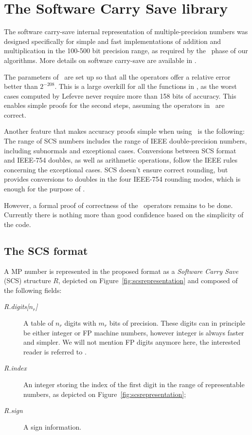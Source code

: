 \section{The Software Carry Save library
\label{sec:SCSLib}}

The software carry-save internal representation of multiple-precision
numbers was designed specifically for simple and fast implementations
of addition and multiplication in the 100-500 bit precision range, as
required by the \accurate\ phase of our algorithms. More details on
software carry-save are available in \cite{DefDin2002,DinDef2003}.

The parameters of \scslib\ are set up so that all the operators offer
a relative error better than $2^{-208}$.  This is a large overkill for
all the functions in \crlibm, as the worst cases computed by Lefevre
never require more than 158 bits of accuracy. This enables simple
proofs for the second steps, assuming the operators in \scslib\ are
correct.

Another feature that makes accuracy proofs simple when using \scslib\ 
is the following: The range of SCS numbers includes the range of IEEE
double-precision numbers, including subnormals and exceptional cases.
Conversions between SCS format and IEEE-754 doubles, as well as
arithmetic operations, follow the IEEE rules concerning the
exceptional cases. SCS doesn't ensure correct rounding, but provides
conversions to doubles in the four IEEE-754 rounding modes, which is
enough for the purpose of \crlibm.

However, a formal proof of correctness of the \scslib\ operators
remains to be done. Currently there is nothing more than good
confidence based on the simplicity of the code.


\subsection{The SCS format}

 A MP number is represented in the proposed format as a
\emph{Software Carry Save} (SCS) structure $R$, depicted on
Figure~\ref{fig:scsrepresentation} and composed of the following
fields:
\begin{description}
\item[\emph{R.digits[$n_r$]}] A table of $n_r$ digits with $m_r$ bits
  of precision. These digits can in principle be either integer or FP
  machine numbers, however integer is always faster and simpler. We
  will not mention FP digits anymore here, the interested reader is
  referred to \cite{DefDin2002,DinDef2003}.
\item[\emph{R.index}] An integer storing the index of the first digit
  in the range of representable numbers, as depicted on
  Figure~\ref{fig:scsrepresentation};
 \item[\emph{R.sign}] A sign information.  
\end{description}

